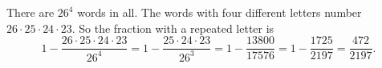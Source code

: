 There are $26^4$ words in all. The words with four different letters number $26\cdot25\cdot24\cdot23$. So the fraction with a repeated letter is
\[
1-\dfrac{26\cdot25\cdot24\cdot23}{26^4}=1-\dfrac{25\cdot24\cdot23}{26^3}=1-\dfrac{13800}{17576}=1-\dfrac{1725}{2197}=\boxed{\dfrac{472}{2197}}.
\]
